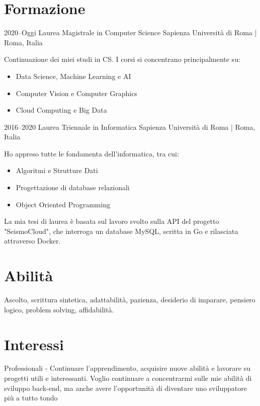 \documentclass[]{cv-style}          %
\begin{document}
\section{Formazione}

\begin{entrylist}
\entry
{2020--Oggi}
{Laurea Magistrale in Computer Science}
{Sapienza Università di Roma | Roma, Italia}
{Continuazione dei miei studi in CS. I corsi si concentrano principalmente su:
\begin{itemize}
    \item Data Science, Machine Learning e AI
    \item Computer Vision e Computer Graphics
    \item Cloud Computing e Big Data
\end{itemize}
}
\entry
{2016--2020}
{Laurea Triennale in Informatica}
{Sapienza Università di Roma | Roma, Italia}
{Ho appreso tutte le fondamenta dell'informatica, tra cui:
\begin{itemize}
    \item Algoritmi e Strutture Dati
    \item Progettazione di database relazionali
    \item Object Oriented Programming
\end{itemize}
La mia tesi di laurea è basata sul lavoro svolto sulla API del progetto "SeismoCloud", che interroga un database MySQL, scritta in Go e rilasciata attraverso Docker.
}
\end{entrylist}


\section{Abilità}
  \vspace{-0.4cm}
Ascolto, 
scrittura sintetica,
adattabilità,
pazienza,
desiderio di imparare,
pensiero logico,
problem solving,
affidabilità.
\vspace{-0.4cm}
\section{Interessi}

\begin{entrylist}
\entry
{Professionali}
{- {\normalfont 
Continuare l'apprendimento, acquisire nuove abilità e lavorare su progetti utili e interessanti. Voglio continuare a concentrarmi sulle mie abilità di sviluppo back-end, ma anche avere l'opportunità di diventare uno sviluppatore più a tutto tondo}}
{}
{\vspace{-0.5cm}}
\end{entrylist}
\end{document}
